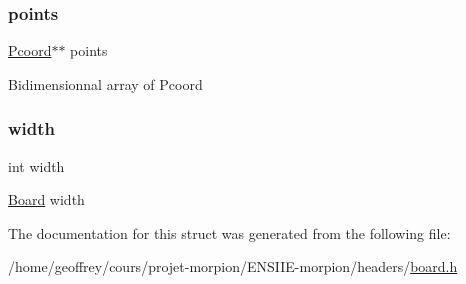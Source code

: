 \subsubsection{\texorpdfstring{points}{points}}
{\footnotesize\ttfamily \hyperlink{board_8h_ab8cc720589a392832ddcc5e65efcbb47}{Pcoord}$\ast$$\ast$ points}

Bidimensionnal array of Pcoord \mbox{\label{struct_board_a2474a5474cbff19523a51eb1de01cda4}} 
\subsubsection{\texorpdfstring{width}{width}}
{\footnotesize\ttfamily int width}

\hyperlink{struct_board}{Board} width 

The documentation for this struct was generated from the following file\+:\begin{DoxyCompactItemize}
\item 
/home/geoffrey/cours/projet-\/morpion/\+E\+N\+S\+I\+I\+E-\/morpion/headers/\hyperlink{board_8h}{board.\+h}\end{DoxyCompactItemize}
